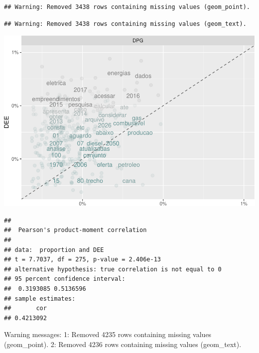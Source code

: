 \documentclass[]{article}
\newenvironment{Shaded}{\begin{snugshade}}{\end{snugshade}}
\newcommand{\KeywordTok}[1]{\textcolor[rgb]{0.13,0.29,0.53}{\textbf{#1}}}
\newcommand{\DataTypeTok}[1]{\textcolor[rgb]{0.13,0.29,0.53}{#1}}
\newcommand{\StringTok}[1]{\textcolor[rgb]{0.31,0.60,0.02}{#1}}
\newcommand{\FunctionTok}[1]{\textcolor[rgb]{0.00,0.00,0.00}{#1}}
\newcommand{\OperatorTok}[1]{\textcolor[rgb]{0.81,0.36,0.00}{\textbf{#1}}}
\newcommand{\AttributeTok}[1]{\textcolor[rgb]{0.77,0.63,0.00}{#1}}
\newcommand{\NormalTok}[1]{#1}
\begin{document}
\begin{verbatim}
## Warning: Removed 3438 rows containing missing values (geom_point).
\end{verbatim}

\begin{verbatim}
## Warning: Removed 3438 rows containing missing values (geom_text).
\end{verbatim}

\includegraphics{markdown_v30_files/figure-latex/unnamed-chunk-55-1.pdf}

\begin{Shaded}
\end{Shaded}

\begin{verbatim}
## 
##  Pearson's product-moment correlation
## 
## data:  proportion and DEE
## t = 7.7037, df = 275, p-value = 2.406e-13
## alternative hypothesis: true correlation is not equal to 0
## 95 percent confidence interval:
##  0.3193085 0.5136596
## sample estimates:
##       cor 
## 0.4213092
\end{verbatim}

\begin{Shaded}
\begin{Highlighting}[]
\FunctionTok{Warning messages:}
\FunctionTok{1:}\AttributeTok{ Removed 4235 rows containing missing values (geom_point). }
\FunctionTok{2:}\AttributeTok{ Removed 4236 rows containing missing values (geom_text). }
\end{Highlighting}
\end{Shaded}
\end{document}
